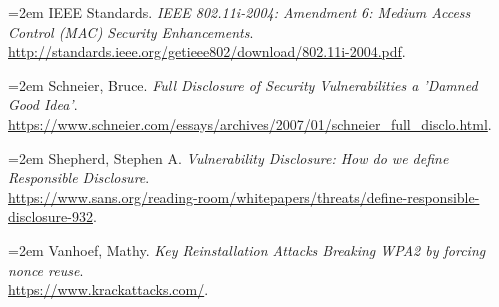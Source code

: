 \documentclass[12pt]{article}
\begin{document}
\noindent \hangindent=2em
IEEE Standards.
\textit{IEEE 802.11i-2004: Amendment 6: Medium Access Control (MAC) Security Enhancements}.
\url{http://standards.ieee.org/getieee802/download/802.11i-2004.pdf}.

\noindent \hangindent=2em
Schneier, Bruce.
\textit{Full Disclosure of Security Vulnerabilities a 'Damned Good Idea'}. \\
\url{https://www.schneier.com/essays/archives/2007/01/schneier_full_disclo.html}.

\noindent \hangindent=2em
Shepherd, Stephen A.
\textit{Vulnerability Disclosure: How do we define Responsible Disclosure}. \\
\url{https://www.sans.org/reading-room/whitepapers/threats/define-responsible-disclosure-932}.

\noindent \hangindent=2em
Vanhoef, Mathy.
\textit{Key Reinstallation Attacks Breaking WPA2 by forcing nonce reuse}. \\
\url{https://www.krackattacks.com/}.
\end{document}
